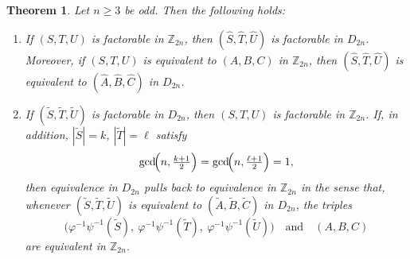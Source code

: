 \documentclass[10pt,a4paper]{amsart}
\newtheorem{thm}{Theorem}
\newcommand{\Aut}{\mathsf{Aut}}
\newcommand{\Z}{\mathbb{Z}}
\begin{document}
\begin{thm}\label{thm:Z2n-to-D2n-factorable}
Let $n\ge 3$ be odd. 
Then the following holds:
\begin{enumerate}
\item If $(S,T,U)$ is factorable in $\Z_{2n}$,
then $(\widehat S,\widehat T,\widehat U)$ is factorable in $D_{2n}$.
Moreover, if $(S,T,U)$ is equivalent to $(A,B,C)$ in $\Z_{2n}$, then
$(\widehat S,\widehat T,\widehat U)$ is equivalent to $(\widehat A,\widehat B,\widehat C)$
in $D_{2n}$.
\item If $(\widetilde S,\widetilde T,\widetilde U)$ is factorable in $D_{2n}$, then
$(S,T,U)$ is factorable in $\Z_{2n}$. 
If, in addition,
$|\widetilde S|=k$, $|\widetilde T|=\ell$ satisfy
\[
\gcd\!\Bigl(n,\tfrac{k+1}{2}\Bigr)=\gcd\!\Bigl(n,\tfrac{\ell+1}{2}\Bigr)=1,
\]
then equivalence in $D_{2n}$ pulls back to equivalence in $\Z_{2n}$ in the sense that, whenever
$(\widetilde S,\widetilde T,\widetilde U)$ is equivalent to $(\widetilde A,\widetilde B,\widetilde C)$ in
$D_{2n}$, the triples
\[
\bigl(\varphi^{-1}\psi^{-1}(\widetilde S),\ \varphi^{-1}\psi^{-1}(\widetilde T),\ \varphi^{-1}\psi^{-1}(\widetilde U)\bigr)
\quad\text{and}\quad
(A,B,C)
\]
are equivalent in $\Z_{2n}$.
\end{enumerate}
\end{thm}
\end{document}
